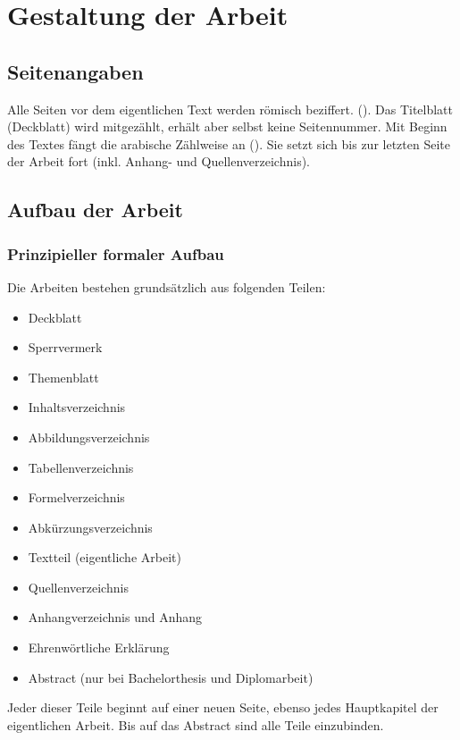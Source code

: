 \section{Gestaltung der Arbeit}
\label{formal-gestaltung}
\subsection{Seitenangaben}
\label{formal-gestaltung-seitenangaben}
Alle Seiten vor dem eigentlichen Text werden römisch beziffert. ().
Das Titelblatt (Deckblatt) wird mitgezählt, erhält aber selbst keine Seitennummer.
Mit Beginn des Textes fängt die arabische Zählweise an ().
Sie setzt sich bis zur letzten Seite der Arbeit fort (inkl. Anhang- und Quellenverzeichnis).

\subsection{Aufbau der Arbeit}
\label{formal-gestaltung-aufbau}
\subsubsection{Prinzipieller formaler Aufbau}
\label{formal-gestaltung-aufbau-prinzipiell}
Die Arbeiten bestehen grundsätzlich aus folgenden Teilen:
\begin{itemize}
    \item Deckblatt
    \item Sperrvermerk
    \item Themenblatt
    \item Inhaltsverzeichnis
    \item Abbildungsverzeichnis
    \item Tabellenverzeichnis
    \item Formelverzeichnis
    \item Abkürzungsverzeichnis
    \item Textteil (eigentliche Arbeit)
    \item Quellenverzeichnis
    \item Anhangverzeichnis und Anhang
    \item Ehrenwörtliche Erklärung
    \item Abstract (nur bei Bachelorthesis und Diplomarbeit)
\end{itemize}
Jeder dieser Teile beginnt auf einer neuen Seite, ebenso jedes Hauptkapitel der eigentlichen Arbeit.
Bis auf das Abstract sind alle Teile einzubinden.

